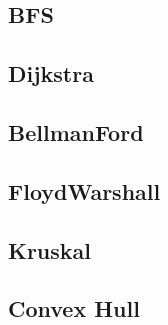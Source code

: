 \subsection{BFS}



\subsection{Dijkstra}


\subsection{BellmanFord}


\subsection{FloydWarshall}


\subsection{Kruskal}


\subsection{Convex Hull}



